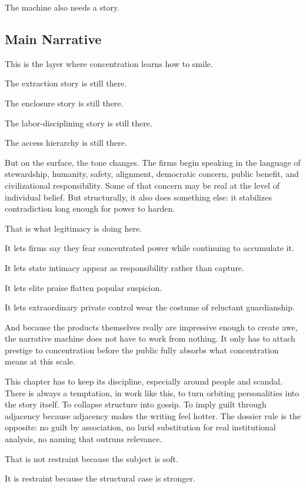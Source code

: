 \documentclass[
  american,
  12pt,
  letterpaper,
]{article}
\begin{document}
The machine also needs a story.

\subsection{Main Narrative}\label{main-narrative}

This is the layer where concentration learns how to smile.

The extraction story is still there.

The enclosure story is still there.

The labor-disciplining story is still there.

The access hierarchy is still there.

But on the surface, the tone changes. The firms begin speaking in the
language of stewardship, humanity, safety, alignment, democratic
concern, public benefit, and civilizational responsibility. Some of that
concern may be real at the level of individual belief. But structurally,
it also does something else: it stabilizes contradiction long enough for
power to harden.

That is what legitimacy is doing here.

It lets firms say they fear concentrated power while continuing to
accumulate it.

It lets state intimacy appear as responsibility rather than capture.

It lets elite praise flatten popular suspicion.

It lets extraordinary private control wear the costume of reluctant
guardianship.

And because the products themselves really are impressive enough to
create awe, the narrative machine does not have to work from nothing. It
only has to attach prestige to concentration before the public fully
absorbs what concentration means at this scale.

This chapter has to keep its discipline, especially around people and
scandal. There is always a temptation, in work like this, to turn
orbiting personalities into the story itself. To collapse structure into
gossip. To imply guilt through adjacency because adjacency makes the
writing feel hotter. The dossier rule is the opposite: no guilt by
association, no lurid substitution for real institutional analysis, no
naming that outruns relevance.

That is not restraint because the subject is soft.

It is restraint because the structural case is stronger.
\end{document}
